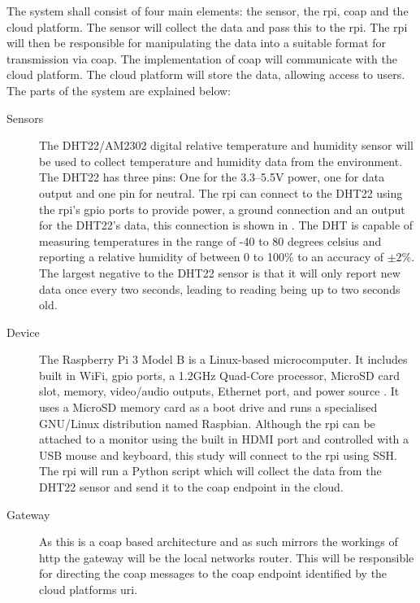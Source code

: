 The system shall consist of four main elements: the sensor, the \gls{rpi}, 
\gls{coap} and the cloud platform.
The sensor will collect the data and pass this to the \gls{rpi}. 
The \gls{rpi} will then be responsible for manipulating
the data into a suitable format for transmission via \gls{coap}. 
The implementation of \gls{coap} will communicate with
the cloud platform. The cloud platform will store the data, 
allowing access to users.
The parts of the system are explained below:

\begin{description}
    \item[Sensors] 
    The DHT22/AM2302 digital relative temperature and humidity 
    sensor will be used to collect temperature and humidity data from the environment.
    The DHT22 has three pins: One for the 3.3--5.5V power, one for data output and
    one pin for neutral. The \gls{rpi} can connect to the DHT22 using the \gls{rpi}'s 
    \gls{gpio} ports to provide power, a ground connection and an output for the 
    DHT22's data, this connection is shown in . The DHT 
    is capable of measuring temperatures in the range of -40 to 80 degrees celsius
    and reporting a relative humidity of between 0 to 100\% to an accuracy of $\pm2$\%.
    The largest negative to the DHT22 sensor is that it will only report new data
    once every two seconds, leading to reading being up to two seconds old.

    \item[Device]
    The Raspberry Pi 3 Model B is a Linux-based microcomputer.
    It includes built in WiFi, \gls{gpio} ports, a 1.2GHz Quad-Core processor,
    MicroSD card slot, memory, video/audio outputs, Ethernet port, and power source 
    \citep{pi_model_2018}. 
    It uses a MicroSD memory card as a boot drive and runs a specialised 
    GNU/Linux distribution named Raspbian. Although the \gls{rpi} can be attached
    to a monitor using the built in HDMI port and controlled with a USB mouse and
    keyboard, this study will connect to the \gls{rpi} using SSH. The \gls{rpi} 
    will run a Python script which will collect the data from the DHT22 sensor 
    and send it to the \gls{coap} endpoint in the cloud.

    \item[Gateway]
    As this is a \gls{coap} based architecture and as such mirrors the workings
    of \gls{http} the gateway will be the local networks router. This will be 
    responsible for directing the \gls{coap} messages to the \gls{coap} endpoint
    identified by the cloud platforms \gls{uri}.


\end{description}
